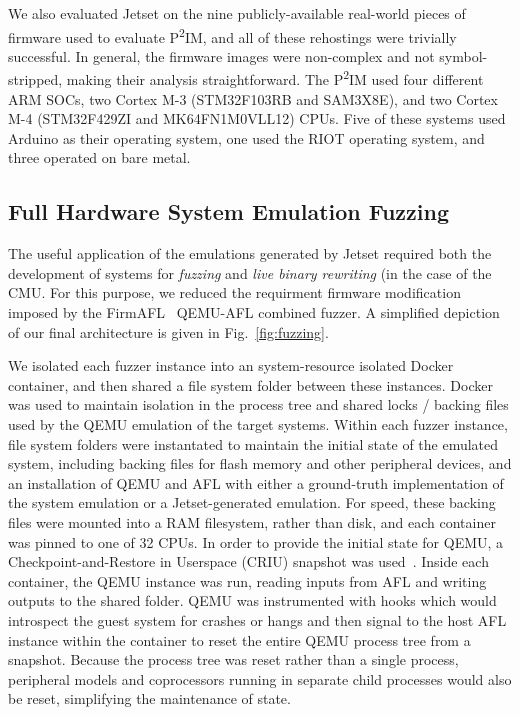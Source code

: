 We also evaluated Jetset on the nine publicly-available real-world pieces of firmware used to evaluate P\textsuperscript{2}IM\cite{p2im2020}, and all of these rehostings were trivially successful.
In general, the firmware images were non-complex and not symbol-stripped, making their analysis straightforward.
The P\textsuperscript{2}IM used four different ARM SOCs, two Cortex M-3 (STM32F103RB and
SAM3X8E), and two Cortex M-4 (STM32F429ZI and MK64FN1M0VLL12) CPUs.
Five of these systems used Arduino as their operating system, one used the RIOT operating system, and three operated on bare metal.

\subsection{Full Hardware System Emulation Fuzzing}

The useful application of the emulations generated by Jetset required both the development of systems for \emph{fuzzing} and \emph{live binary rewriting} (in the case of the CMU.
For this purpose, we reduced the requirment firmware modification imposed by the FirmAFL~\cite{zheng2019firm} QEMU-AFL combined fuzzer.
A simplified depiction of our final architecture is given in Fig.~\ref{fig:fuzzing}.

We isolated each fuzzer instance into an system-resource isolated Docker~\cite{docker2020docker} container, and then shared a file system folder between these instances.
Docker was used to maintain isolation in the process tree and shared locks / backing files used by the QEMU emulation of the target systems.
Within each fuzzer instance, file system folders were instantated to maintain the initial state of the emulated system, including backing files for flash memory and other peripheral devices, and an installation of QEMU and AFL with either a ground-truth implementation of the system emulation or a Jetset-generated emulation.
For speed, these backing files were mounted into a RAM filesystem, rather than disk, and each container was pinned to one of 32 CPUs.
In order to provide the initial state for QEMU, a Checkpoint-and-Restore in Userspace (CRIU) snapshot was used~\cite{venkatesh2019fast}.
Inside each container, the QEMU instance was run, reading inputs from AFL and writing outputs to the shared folder.
QEMU was instrumented with hooks which would introspect the guest system for crashes or hangs and then signal to the host AFL instance within the container to reset the entire QEMU process tree from a snapshot.
Because the process tree was reset rather than a single process, peripheral models and coprocessors running in separate child processes would also be reset, simplifying the maintenance of state.

